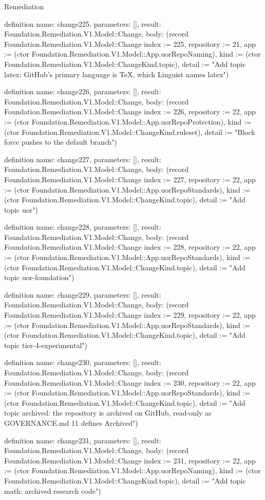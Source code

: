 \begin{lexlean}{Remediation}
\begin{semanticmodule}
definition{
  name: change225,
  parameters: [],
  result: Foundation.Remediation.V1.Model::Change,
  body: (record Foundation.Remediation.V1.Model::Change {index := 225, repository := 21, app := (ctor Foundation.Remediation.V1.Model::App.uorRepoNaming), kind := (ctor Foundation.Remediation.V1.Model::ChangeKind.topic), detail := "Add topic latex: GitHub's primary language is TeX, which Linguist names latex"})
}

definition{
  name: change226,
  parameters: [],
  result: Foundation.Remediation.V1.Model::Change,
  body: (record Foundation.Remediation.V1.Model::Change {index := 226, repository := 22, app := (ctor Foundation.Remediation.V1.Model::App.uorRepoProtection), kind := (ctor Foundation.Remediation.V1.Model::ChangeKind.ruleset), detail := "Block force pushes to the default branch"})
}

definition{
  name: change227,
  parameters: [],
  result: Foundation.Remediation.V1.Model::Change,
  body: (record Foundation.Remediation.V1.Model::Change {index := 227, repository := 22, app := (ctor Foundation.Remediation.V1.Model::App.uorRepoStandards), kind := (ctor Foundation.Remediation.V1.Model::ChangeKind.topic), detail := "Add topic uor"})
}

definition{
  name: change228,
  parameters: [],
  result: Foundation.Remediation.V1.Model::Change,
  body: (record Foundation.Remediation.V1.Model::Change {index := 228, repository := 22, app := (ctor Foundation.Remediation.V1.Model::App.uorRepoStandards), kind := (ctor Foundation.Remediation.V1.Model::ChangeKind.topic), detail := "Add topic uor-foundation"})
}

definition{
  name: change229,
  parameters: [],
  result: Foundation.Remediation.V1.Model::Change,
  body: (record Foundation.Remediation.V1.Model::Change {index := 229, repository := 22, app := (ctor Foundation.Remediation.V1.Model::App.uorRepoStandards), kind := (ctor Foundation.Remediation.V1.Model::ChangeKind.topic), detail := "Add topic tier-4-experimental"})
}

definition{
  name: change230,
  parameters: [],
  result: Foundation.Remediation.V1.Model::Change,
  body: (record Foundation.Remediation.V1.Model::Change {index := 230, repository := 22, app := (ctor Foundation.Remediation.V1.Model::App.uorRepoStandards), kind := (ctor Foundation.Remediation.V1.Model::ChangeKind.topic), detail := "Add topic archived: the repository is archived on GitHub, read-only as GOVERNANCE.md 11 defines Archived"})
}

definition{
  name: change231,
  parameters: [],
  result: Foundation.Remediation.V1.Model::Change,
  body: (record Foundation.Remediation.V1.Model::Change {index := 231, repository := 22, app := (ctor Foundation.Remediation.V1.Model::App.uorRepoNaming), kind := (ctor Foundation.Remediation.V1.Model::ChangeKind.topic), detail := "Add topic math: archived research code"})
}


\end{semanticmodule}
\end{lexlean}
